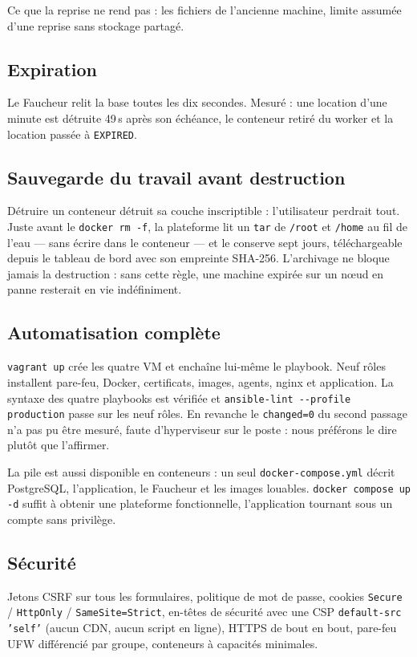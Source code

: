 \documentclass[11pt,a4paper]{article}
\begin{document}
Ce que la reprise ne rend pas : les fichiers de l'ancienne machine, limite assumée d'une reprise
sans stockage partagé.

\subsection*{Expiration}
Le Faucheur relit la base toutes les dix secondes. Mesuré : une location d'une minute est détruite
49\,s après son échéance, le conteneur retiré du worker et la location passée à \texttt{EXPIRED}.

\subsection*{Sauvegarde du travail avant destruction}
Détruire un conteneur détruit sa couche inscriptible : l'utilisateur perdrait tout. Juste avant le
\texttt{docker rm -f}, la plateforme lit un \texttt{tar} de \texttt{/root} et \texttt{/home} au fil
de l'eau --- sans écrire dans le conteneur --- et le conserve sept jours, téléchargeable depuis le
tableau de bord avec son empreinte SHA-256. L'archivage ne bloque jamais la destruction : sans cette
règle, une machine expirée sur un n\oe{}ud en panne resterait en vie indéfiniment.

\subsection*{Automatisation complète}
\texttt{vagrant up} crée les quatre VM et enchaîne lui-même le playbook. Neuf rôles installent
pare-feu, Docker, certificats, images, agents, nginx et application. La syntaxe des quatre playbooks
est vérifiée et \texttt{ansible-lint -{}-profile production} passe sur les neuf rôles. En revanche le
\texttt{changed=0} du second passage n'a pas pu être mesuré, faute d'hyperviseur sur le poste : nous
préférons le dire plutôt que l'affirmer.

La pile est aussi disponible en conteneurs : un seul \texttt{docker-compose.yml} décrit PostgreSQL,
l'application, le Faucheur et les images louables. \texttt{docker compose up -d} suffit à obtenir
une plateforme fonctionnelle, l'application tournant sous un compte sans privilège.

\subsection*{Sécurité}
Jetons CSRF sur tous les formulaires, politique de mot de passe, cookies \texttt{Secure} /
\texttt{HttpOnly} / \texttt{SameSite=Strict}, en-têtes de sécurité avec une CSP
\texttt{default-src 'self'} (aucun CDN, aucun script en ligne), HTTPS de bout en bout,
pare-feu UFW différencié par groupe, conteneurs à capacités minimales.
\end{document}
